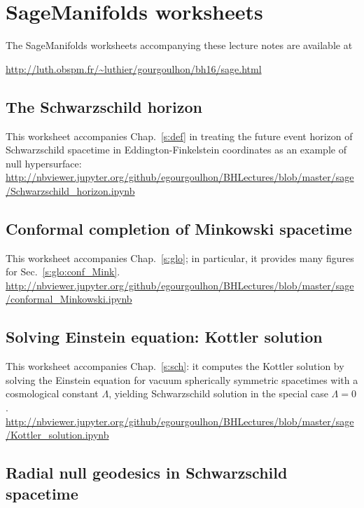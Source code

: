 \section{SageManifolds worksheets} \label{s:sam:worksheets}

The SageManifolds worksheets accompanying these lecture notes are available
at\\

\centerline{
\url{http://luth.obspm.fr/~luthier/gourgoulhon/bh16/sage.html}}

\subsection{The Schwarzschild horizon} \label{s:sam:Schwarz_hor}

This worksheet accompanies Chap.~\ref{s:def} in treating the future event horizon of
Schwarzschild spacetime in Eddington-Finkelstein coordinates as an example of null hypersurface:\\[1ex]
{\footnotesize
\url{http://nbviewer.jupyter.org/github/egourgoulhon/BHLectures/blob/master/sage/Schwarzschild_horizon.ipynb}
}

\subsection{Conformal completion of Minkowski spacetime}

This worksheet accompanies Chap.~\ref{s:glo}; in particular, it provides
many figures for Sec.~\ref{s:glo:conf_Mink}.\\[1ex]
{\footnotesize
\url{http://nbviewer.jupyter.org/github/egourgoulhon/BHLectures/blob/master/sage/conformal_Minkowski.ipynb}
}

\subsection{Solving Einstein equation: Kottler solution} \label{s:sam:Kottler_solution}


This worksheet accompanies Chap.~\ref{s:sch}: it computes the Kottler solution by solving the Einstein
equation for vacuum spherically symmetric spacetimes with a cosmological constant $\Lambda$,
yielding Schwarzschild solution in the special case $\Lambda=0$. \\[1ex]
{\footnotesize
\url{http://nbviewer.jupyter.org/github/egourgoulhon/BHLectures/blob/master/sage/Kottler_solution.ipynb}
}

\subsection{Radial null geodesics in Schwarzschild spacetime}


